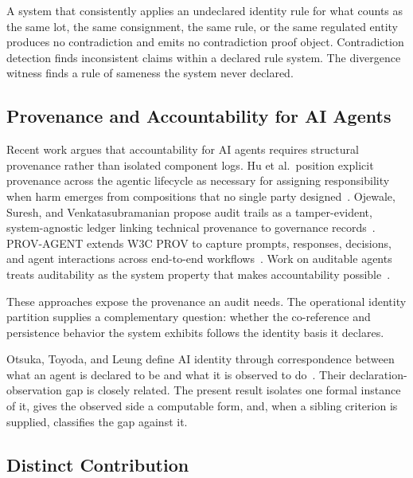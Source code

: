 \documentclass[11pt]{article}
\theoremstyle{plain}
\theoremstyle{definition}
\theoremstyle{remark}
\begin{document}
A system that consistently applies an undeclared identity rule
for what counts as the same lot, the same consignment,
the same rule, or the same regulated entity
produces no contradiction and emits no contradiction proof object.
Contradiction detection finds inconsistent claims within a declared rule system.
The divergence witness finds a rule of sameness the system never declared.

\subsection{Provenance and Accountability for AI Agents}

Recent work argues that accountability for AI agents
requires structural provenance rather than isolated component logs.
Hu et al.\ position explicit provenance across the agentic lifecycle
as necessary for assigning responsibility
when harm emerges from compositions
that no single party designed~\citep{hu2026provenance}.
Ojewale, Suresh, and Venkatasubramanian
propose audit trails as a tamper-evident, system-agnostic ledger
linking technical provenance to governance records~\citep{ojewale2026audit}.
PROV-AGENT extends W3C PROV to capture prompts, responses, decisions,
and agent interactions across end-to-end workflows~\citep{souza2025provagent}.
Work on auditable agents treats auditability as the system property
that makes accountability possible~\citep{nian2026auditable}.

These approaches expose the provenance an audit needs.
The operational identity partition supplies a complementary question:
whether the co-reference and persistence behavior the system exhibits
follows the identity basis it declares.

Otsuka, Toyoda, and Leung define AI identity through correspondence
between what an agent is declared to be
and what it is observed to do~\citep{otsuka2026identity}.
Their declaration-observation gap is closely related.
The present result isolates one formal instance of it,
gives the observed side a computable form,
and, when a sibling criterion is supplied, classifies the gap against it.

\subsection{Distinct Contribution}
\end{document}
